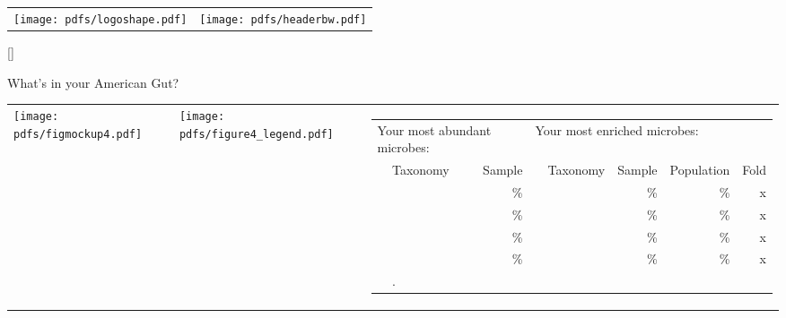 \documentclass[landscape]{article}
\begin{document}
\begin{tabular}{ @{} m{4.05cm} m{16cm} }
	\texttt{[image: pdfs/logoshape.pdf]} & \texttt{[image: pdfs/headerbw.pdf]} \\
\end{tabular}
	
\vspace{0.65cm}

\begin{center}

\StrLen{\yourname}[\yournameLen]


\end{center}

\vspace{0.65cm}

{\Huge What's in your American Gut?}

\vspace{2mm}

\begin{tabular*}{\textwidth}{ m{2.5in} m{1.3in} m{6.0in} }
    \texttt{[image: pdfs/figmockup4.pdf]} 
    &
    \texttt{[image: pdfs/figure4\_legend.pdf]}
    &
    {\large 
    \vspace{-6mm}
    \parbox[b][][t]{6in}{
	\begin{tabular}{ c l r c l r r r }
    	    \multicolumn{3}{l}{\Large Your most abundant microbes:} & \multicolumn{5}{l}{\Large Your most enriched microbes:}\\ \addlinespace[2mm]
		\cline{2-3} \cline{5-8} \addlinespace[1mm]
		& Taxonomy & Sample & & Taxonomy & Sample & Population & Fold \\
		\cline{2-3} \cline{5-8} \addlinespace[1mm]
		& \abundTaxonA{} & \abundSamplA{}\% & & \enrichTaxonA{} & \enrichSamplA{}\% & \enrichPopulA{}\% & \enrichFolddA{}x \\
		& \abundTaxonB{} & \abundSamplB{}\% & & \enrichTaxonB{} & \enrichSamplB{}\% & \enrichPopulB{}\% & \enrichFolddB{}x \\
		& \abundTaxonC{} & \abundSamplC{}\% & & \enrichTaxonC{} & \enrichSamplC{}\% & \enrichPopulC{}\% & \enrichFolddC{}x \\
		& \abundTaxonD{} & \abundSamplD{}\% & & \enrichTaxonD{} & \enrichSamplD{}\% & \enrichPopulD{}\% & \enrichFolddD{}x \\
		\cline{2-3} \cline{5-8} \addlinespace[3mm]
		& \multicolumn{7}{p{5.2in}}{\large \rareList{}.}
	\end{tabular}
	}
	}
\end{tabular*}
\end{document}
